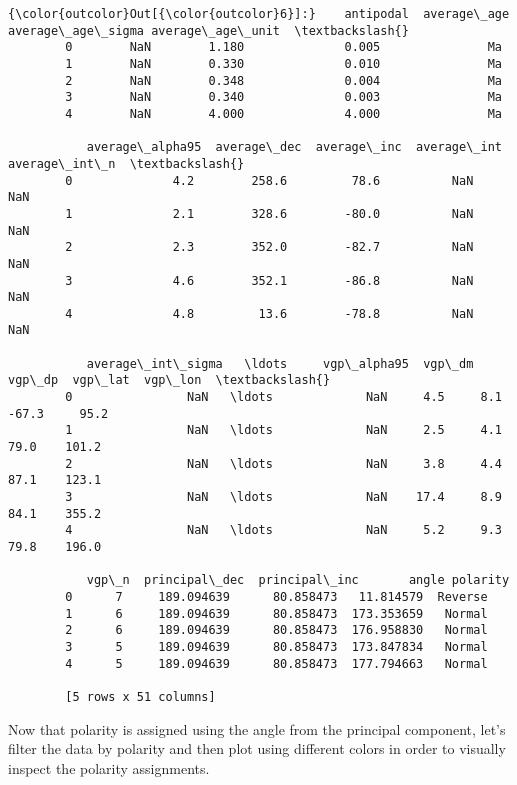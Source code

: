 \documentclass{article}
\begin{document}
            \begin{Verbatim}[commandchars=\\\{\}]
{\color{outcolor}Out[{\color{outcolor}6}]:}    antipodal  average\_age  average\_age\_sigma average\_age\_unit  \textbackslash{}
        0        NaN        1.180              0.005               Ma   
        1        NaN        0.330              0.010               Ma   
        2        NaN        0.348              0.004               Ma   
        3        NaN        0.340              0.003               Ma   
        4        NaN        4.000              4.000               Ma   
        
           average\_alpha95  average\_dec  average\_inc  average\_int  average\_int\_n  \textbackslash{}
        0              4.2        258.6         78.6          NaN            NaN   
        1              2.1        328.6        -80.0          NaN            NaN   
        2              2.3        352.0        -82.7          NaN            NaN   
        3              4.6        352.1        -86.8          NaN            NaN   
        4              4.8         13.6        -78.8          NaN            NaN   
        
           average\_int\_sigma   \ldots     vgp\_alpha95  vgp\_dm  vgp\_dp  vgp\_lat  vgp\_lon  \textbackslash{}
        0                NaN   \ldots             NaN     4.5     8.1    -67.3     95.2   
        1                NaN   \ldots             NaN     2.5     4.1     79.0    101.2   
        2                NaN   \ldots             NaN     3.8     4.4     87.1    123.1   
        3                NaN   \ldots             NaN    17.4     8.9     84.1    355.2   
        4                NaN   \ldots             NaN     5.2     9.3     79.8    196.0   
        
           vgp\_n  principal\_dec  principal\_inc       angle polarity  
        0      7     189.094639      80.858473   11.814579  Reverse  
        1      6     189.094639      80.858473  173.353659   Normal  
        2      6     189.094639      80.858473  176.958830   Normal  
        3      5     189.094639      80.858473  173.847834   Normal  
        4      5     189.094639      80.858473  177.794663   Normal  
        
        [5 rows x 51 columns]
\end{Verbatim}
        
    Now that polarity is assigned using the angle from the principal
component, let's filter the data by polarity and then plot using
different colors in order to visually inspect the polarity assignments.
\end{document}
